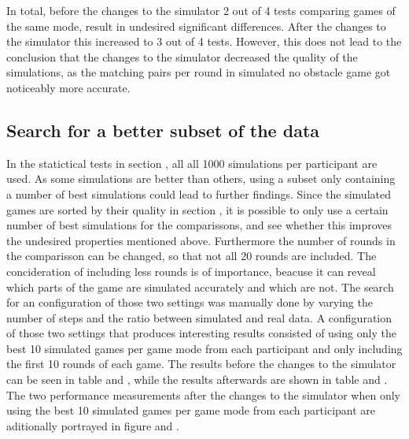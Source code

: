 In total, before the changes to the simulator 2 out of 4 tests comparing games of the same mode, result in undesired significant differences. After the changes to the simulator this increased to 3 out of 4 tests. However, this does not lead to the conclusion that the changes to the simulator decreased the quality of the simulations, as the matching pairs per round in simulated no obstacle game got noticeably more accurate. 

\subsection{Search for a better subset of the data}
In the statictical tests in section , all all 1000 simulations per participant are used. As some simulations are better than others, using a subset only containing a number of best simulations could lead to further findings. Since the simulated games are sorted by their quality in section , it is possible to only use a certain number of best simulations for the comparissons, and see whether this improves the undesired properties mentioned above. Furthermore the number of rounds in the comparisson can be changed, so that not all 20 rounds are included. The concideration of including less rounds is of importance, beacuse it can reveal which parts of the game are simulated accurately and which are not. The search for an configuration of those two settings was manually done by varying the number of steps and the ratio between simulated and real data. A configuration of those two settings that produces interesting results consisted of using only the best 10 simulated games per game mode from each participant and only including the first 10 rounds of each game. The results before the changes to the simulator can be seen in table  and , while the results afterwards are shown in table  and . The two performance measurements after the changes to the simulator when only using the best 10 simulated games per game mode from each participant are aditionally portrayed in figure  and .

